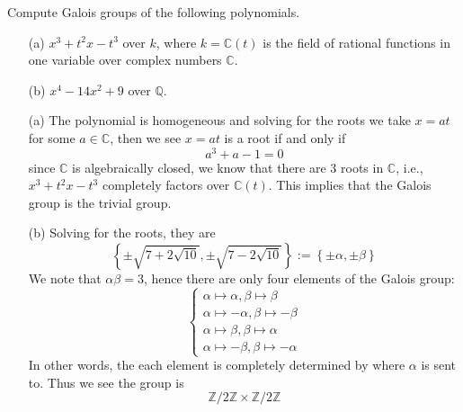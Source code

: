 \documentclass[openany]{book}
\newcommand{\Z}{\mathbb{Z}}
\newcommand{\C}{\mathbb{C}}
\begin{document}
\begin{prob}
    Compute Galois groups of the following polynomials.
    \begin{itemize}
        \item[(a)] \(x^3 + t^2x - t^3\) over \(k\), where \(k = \mathbb{C}(t)\) is the field of rational functions in one variable over complex numbers \(\mathbb{C}\).
        \item[(b)] \(x^4 - 14x^2 + 9\) over \(\mathbb{Q}\).
    \end{itemize}
\end{prob}
\begin{itemize}
    \item[(a)] The polynomial is homogeneous and solving for the roots we take $x=at$ for some $a\in\C$, then we see $x=at$ is a root if and only if 
    \begin{equation*}
        a^3+a-1=0
    \end{equation*}
    since $\C$ is algebraically closed, we know that there are $3$ roots in $\C$, i.e., $x^3+t^2x-t^3$ completely factors over $\C(t)$. This implies that the Galois group is the trivial group.
    \item[(b)] Solving for the roots, they are 
    \begin{equation*}
        \left\{\pm\sqrt{7+2\sqrt{10}}, \pm\sqrt{7-2\sqrt{10}}\right\}:=\left\{\pm\alpha, \pm\beta\right\}
    \end{equation*}
    We note that $\alpha\beta=3$, hence there are only four elements of the Galois group:
    \begin{equation*}
        \begin{cases}
            \alpha\mapsto \alpha, \beta\mapsto \beta\\
            \alpha\mapsto-\alpha, \beta\mapsto-\beta\\
            \alpha\mapsto\beta,\beta\mapsto\alpha\\
            \alpha\mapsto-\beta,\beta\mapsto-\alpha
        \end{cases}
    \end{equation*}
    In other words, the each element is completely determined by where $\alpha$ is sent to. Thus we see the group is 
    \begin{equation*}
        \Z/2\Z\times\Z/2\Z
    \end{equation*}
\end{itemize}
\end{document}
